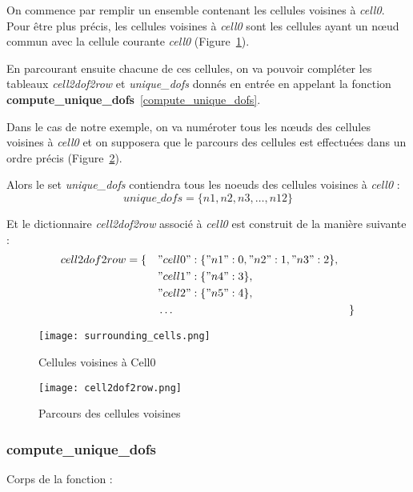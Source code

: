 On commence par remplir un ensemble contenant les cellules voisines à \textit{cell0}. Pour être plus précis, les cellules voisines à \textit{cell0} sont les cellules ayant un nœud commun avec la cellule courante \textit{cell0} (Figure~\ref{fig3}).

En parcourant ensuite chacune de ces cellules, on va pouvoir compléter les tableaux \textit{cell2dof2row} et \textit{unique\_dofs} donnés en entrée en appelant la fonction \textbf{compute\_unique\_dofs}~\ref{compute_unique_dofs}. 

Dans le cas de notre exemple, on va numéroter tous les nœuds des cellules voisines à \textit{cell0} et on supposera que le parcours des cellules est effectuées dans un ordre précis (Figure~\ref{fig4}).

Alors le set \textit{unique\_dofs} contiendra tous les noeuds des cellules voisines à \textit{cell0} : 
$$unique\_dofs = \{n1,n2,n3,\dots,n12\}$$

Et le dictionnaire \textit{cell2dof2row} associé à \textit{cell0} est construit de la manière suivante :
$$cell2dof2row = \begin{aligned}[t]
	\{\quad&"cell0":\{"n1":0,"n2":1,"n3":2\},&& \\
	&"cell1":\{"n4":3\}, \\
	&"cell2":\{"n5":4\}, \\
	&\dots &&\}
\end{aligned}$$

\begin{minipage}{0.48\linewidth}
	\begin{figure}[H]
		\centering
		\texttt{[image: surrounding\_cells.png]}
		\caption{Cellules voisines à Cell0}
		\label{fig3}
	\end{figure}
\end{minipage}
\begin{minipage}{0.48\linewidth}
	\begin{figure}[H]
		\centering
		\texttt{[image: cell2dof2row.png]}
		\caption{Parcours des cellules voisines}
		\label{fig4}
	\end{figure}
\end{minipage}


\subsubsection*{compute\_unique\_dofs}
\label{compute_unique_dofs}

Corps de la fonction :

